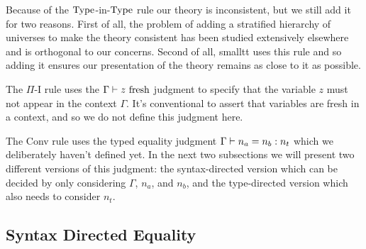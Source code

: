Because of the $\text{Type}$-in-$\text{Type}$ rule our theory is inconsistent, but we still add it for two reasons.
First of all, the problem of adding a stratified hierarchy of universes to make the theory consistent has been studied extensively elsewhere and is orthogonal to our concerns.
Second of all, smalltt uses this rule and so adding it ensures our presentation of the theory remains as close to it as possible.

The $\Pi$-I rule uses the $\Gamma \vdash z \text{ fresh}$ judgment to specify that the variable $z$ must not appear in the context $\Gamma$.
It's conventional to assert that variables are fresh in a context, and so we do not define this judgment here.

The Conv rule uses the typed equality judgment $\Gamma \vdash n_a = n_b : n_t$ which we deliberately haven't defined yet.
In the next two subsections we will present two different versions of this judgment: the syntax-directed version which can be decided by only considering $\Gamma$, $n_a$, and $n_b$, and the type-directed version which also needs to consider $n_t$.

\subsection{Syntax Directed Equality}

